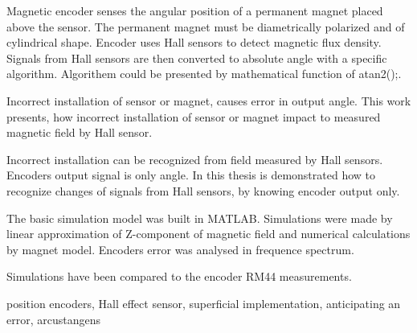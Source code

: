 \documentclass[a4paper,twoside,openright,12pt]{book}
\begin{document}
Magnetic encoder senses the angular position of a permanent magnet placed above the sensor.
The permanent magnet must be diametrically polarized and of cylindrical shape.
Encoder uses Hall sensors to detect magnetic flux density.
Signals from Hall sensors are then converted to absolute angle with a specific algorithm.
Algorithem could be presented by mathematical function of atan2();.

Incorrect installation of sensor or magnet, causes error in output angle.
This work presents, how incorrect installation of sensor or magnet  impact to measured magnetic field by Hall sensor.

Incorrect installation can be recognized from field measured by Hall sensors. Encoders output signal is only angle.
In this thesis is demonstrated how to recognize changes of signals from Hall sensors, by knowing encoder output only.

The basic simulation model was built in MATLAB. Simulations were  made  by linear approximation of Z-component of magnetic field and numerical calculations by magnet model.
Encoders error was analysed in frequence spectrum.

Simulations have been compared to the encoder RM44 measurements.

\keywords position encoders, Hall effect sensor, superficial implementation, anticipating an error, arcustangens









\end{document}
